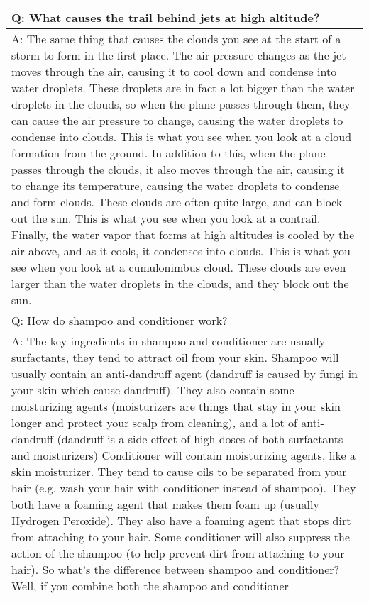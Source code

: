 \documentclass[11pt]{article}
\begin{document}
\begin{table*}[t]
    \small
    \centering
\begin{tabular}{p{}}
    \toprule
    Q: What causes the trail behind jets at high altitude?\\
  \midrule
  A: The same thing that causes the clouds you see at the start of a storm to form in the first place. The air pressure changes as the jet moves through the air, causing it to cool down and condense into water droplets. These droplets are in fact a lot bigger than the water droplets in the clouds, so when the plane passes through them, they can cause the air pressure to change, causing the water droplets to condense into clouds. This is what you see when you look at a cloud formation from the ground. In addition to this, when the plane passes through the clouds, it also moves through the air, causing it to change its temperature, causing the water droplets to condense and form clouds. These clouds are often quite large, and can block out the sun. This is what you see when you look at a contrail. Finally, the water vapor that forms at high altitudes is cooled by the air above, and as it cools, it condenses into clouds. This is what you see when you look at a cumulonimbus cloud. These clouds are even larger than the water droplets in the clouds, and they block out the sun.\\
  \midrule
  Q: How do shampoo and conditioner work?\\
  \midrule
  A: The key ingredients in shampoo and conditioner are usually surfactants, they tend to attract oil from your skin. Shampoo will usually contain an anti-dandruff agent (dandruff is caused by fungi in your skin which cause dandruff). They also contain some moisturizing agents (moisturizers are things that stay in your skin longer and protect your scalp from cleaning), and a lot of anti-dandruff (dandruff is a side effect of high doses of both surfactants and moisturizers) Conditioner will contain moisturizing agents, like a skin moisturizer. They tend to cause oils to be separated from your hair (e.g. wash your hair with conditioner instead of shampoo). They both have a foaming agent that makes them foam up (usually Hydrogen Peroxide). They also have a foaming agent that stops dirt from attaching to your hair. Some conditioner will also suppress the action of the shampoo (to help prevent dirt from attaching to your hair). So what's the difference between shampoo and conditioner? Well, if you combine both the shampoo and conditioner\\

\end{tabular}
\end{table*}
\end{document}

